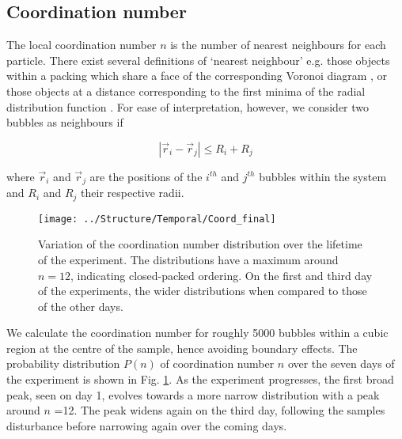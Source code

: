\documentclass[10pt,a4paper]{article}
\begin{document}
\subsection{Coordination number}

The local coordination number $n$ is the number of nearest neighbours for each particle. There exist several definitions of `nearest neighbour' e.g. those objects within a packing which share a face of the corresponding Voronoi diagram \cite{Olafsen2010}, or those objects at a distance corresponding to the first minima of the radial distribution function \cite{Aste2005}. For ease of interpretation, however, we consider two bubbles as neighbours if

\begin{equation}
|\vec{r}_i - \vec{r}_j| \le R_i + R_j
\label{eqn:Neighbourhood}
\end{equation}

where $\vec{r}_i$ and $\vec{r}_j$ are the positions of the $i^{th}$ and $j^{th}$ bubbles within the system and $R_i$ and $R_j$ their respective radii. 
 
\begin{figure}[H]
\centering
\texttt{[image: ../Structure/Temporal/Coord\_final]}
\caption{Variation of the coordination number distribution over the lifetime of the experiment. The distributions have a maximum around $n=12$, indicating closed-packed ordering. On the first and third day of the experiments, the wider distributions when compared to those of the other days.}


\label{fig:coord_distribution}
\end{figure}

We calculate the coordination number for roughly 5000 bubbles within a cubic region at the centre of the sample, hence avoiding boundary effects. The probability distribution $P(n)$ of coordination number $n$ over the seven days of the experiment is shown in Fig. \ref{fig:coord_distribution}.
As the experiment progresses, the first broad peak, seen on day 1, evolves towards a more narrow distribution with a peak around $n$ =12. The peak widens again on the third day, following the samples disturbance before narrowing again over the coming days.
\end{document}

